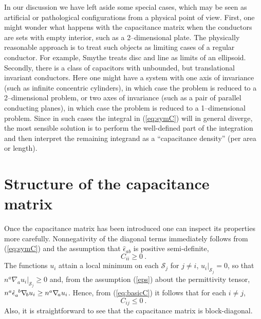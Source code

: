 \documentclass[12pt]{iopart}
\newcommand{\nab}[1]{\nabla_{\! #1}}
\newcommand{\be}{\begin{equation}}
\newcommand{\ee}{\end{equation}}
\newcommand{\0}{\vct{0}}
\theoremstyle{plain} \newtheorem{tm}{Theorem}[section]
\theoremstyle{plain} \newtheorem{lm}[tm]{Lemma}
\theoremstyle{definition} \newtheorem{defn}[tm]{Definition}
\begin{document}
In our discussion we have left aside some special cases, which may be seen as artificial or pathological configurations from a physical point of view. First, one might wonder what happens with the capacitance matrix when the conductors are sets with empty interior, such as a 2--dimensional plate. The physically reasonable approach is to treat such objects as limiting cases of a regular conductor. For example, Smythe \cite{Smythe} treats disc and line as limits of an ellipsoid. Secondly, there is a class of capacitors with unbounded, but translational invariant conductors. Here one might have a system with one axis of invariance (such as infinite concentric cylinders), in which case the problem is reduced to a 2--dimensional problem, or two axes of invariance (such as a pair of parallel conducting planes), in which case the problem is reduced to a 1--dimensional problem. Since in such cases the integral in (\ref{eq:symC}) will in general diverge, the most sensible solution is to perform the well-defined part of the integration and then interpret the remaining integrand as a ``capacitance density'' (per area or length).

\bigskip




\section{Structure of the capacitance matrix} %

Once the capacitance matrix has been introduced one can inspect its properties more carefully. Nonnegativity of the diagonal terms immediately follows from (\ref{eq:symC}) and the assumption that $\hat{\epsilon}_{ab}$ is positive semi-definite,
\be
C_{ii} \ge 0 \ .
\ee
The functions $u_i$ attain a local minimum on each $\mathcal{S}_j$ for $j \ne i$, $u_i|_{\mathcal{S}_j} = 0$, so that $n^a \nab{a} u_i|_{\mathcal{S}_j} \ge 0$ and, from the assumption (\ref{eps}) about the permittivity tensor, $n^a \tensor{\hat{\epsilon}}{_a^b} \nab{b} u_i \ge n^a \nab{a} u_i$. Hence, from (\ref{eq:basicC}) it follows that for each $i \ne j$,
\be
C_{ij} \le 0 \ .
\ee
Also, it is straightforward to see that the capacitance matrix is block-diagonal.

\medskip
\end{document}
